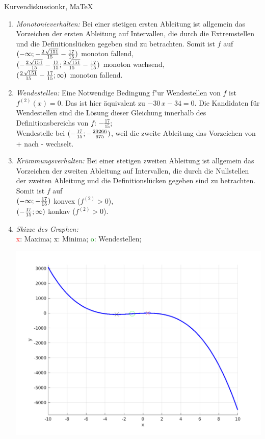 \begin{MAufgabe}{Kurvendiskussion}{kr, MaTeX}
\begin{enumerate}
 \item \emph{Monotonieverhalten:} 
 Bei einer stetigen ersten Ableitung ist allgemein das Vorzeichen der ersten Ableitung auf Intervallen, die durch die Extremstellen und die Definitionsl\"ucken gegeben sind zu betrachten. Somit ist $f$ auf \\ 
 $(-\infty; - \frac{2\, \sqrt{151}}{15} - \frac{17}{15})$ monoton fallend, \\ 
 $( - \frac{2\, \sqrt{151}}{15} - \frac{17}{15};\frac{2\, \sqrt{151}}{15} - \frac{17}{15})$ monoton  wachsend, \\ 
 $(\frac{2\, \sqrt{151}}{15} - \frac{17}{15}; \infty)$ monoton fallend. \\ 
 \item \emph{Wendestellen:} 
 Eine Notwendige Bedingung f"ur Wendestellen von $f$ ist $f^{(2)}(x)=0$. 
 Das ist hier \"aquivalent zu $ - 30\, x - 34=0$. 
 Die Kandidaten f\"ur Wendestellen sind die L\"osung dieser Gleichung innerhalb des Definitionsbereichs von $f$: $- \frac{17}{15}$; \\ 
 Wendestelle bei $(- \frac{17}{15};- \frac{29266}{675})$, weil die zweite Ableitung das Vorzeichen von + nach - wechselt. \\ 
 \item \emph{Kr\"ummungsverhalten:} 
 Bei einer stetigen zweiten Ableitung ist allgemein das Vorzeichen der zweiten Ableitung auf Intervallen, die durch die Nullstellen der zweiten Ableitung und die Definitionsl\"ucken gegeben sind zu betrachten. 
 Somit ist $f$ auf \\ 
 $(-\infty ;- \frac{17}{15})$  konvex ($f^{(2)}>0$), \\ 
 $(- \frac{17}{15}; \infty)$  konkav ($f^{(2)}>0$). \\ 
 \item \emph{Skizze des Graphen:} \\ 
 {\textcolor{red} x}: Maxima; {\textcolor{black} x}: Minima; {\textcolor{green} o}: Wendestellen; 
  \begin{center}
  \includegraphics[width=0.8\linewidth]{Abb_zur_Ag_autogenerated_fractions_3.png} \end{center}
  
 \end{enumerate}
 \else\relax\fi
  \end{MAufgabe}